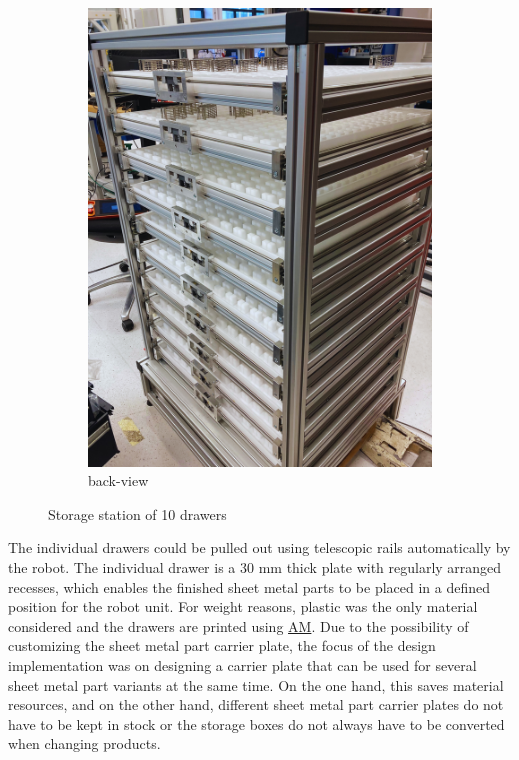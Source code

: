 \begin{figure}[h]
\begin{subfigure}{0.35\textwidth}
        \label{fig:storage-station-front}
    \end{subfigure}\hspace{1cm}
    \begin{subfigure}{0.36\textwidth}
        \centering
        \includegraphics[width=\textwidth]{figures/storage-station-back.png} %
        \caption{back-view}
        \label{fig:storage-station-back}
    \end{subfigure}
    \caption{Storage station of 10 drawers}
    \label{fig:storage-station-main}
\end{figure}

The individual drawers could be pulled out using
telescopic rails automatically by the robot. 
The individual drawer is a 30 mm thick plate with regularly arranged recesses,
which enables the finished sheet metal parts to be placed in a defined position for the robot unit. For
weight reasons, plastic was the only material considered and the drawers are printed using \hyperref[acro:AM]{AM}.
Due to the possibility of customizing the sheet metal part carrier plate, the
focus of the design implementation was on designing a carrier plate that can be used for several sheet
metal part variants at the same time. On the one hand, this saves material resources, and on the other
hand, different sheet metal part carrier plates do not have to be kept in stock or the storage boxes do
not always have to be converted when changing products.


